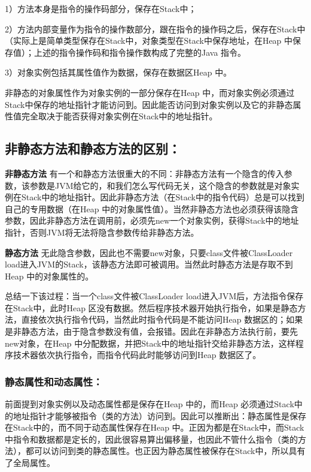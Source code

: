 \documentclass[10pt,b5paper]{article}
\begin{document}
1）方法本身是指令的操作码部分，保存在Stack中；

2）方法内部变量作为指令的操作数部分，跟在指令的操作码之后，保存在Stack中（实际上是简单类型保存在Stack中，对象类型在Stack中保存地址，在Heap 中保存值）；上述的指令操作码和指令操作数构成了完整的Java 指令。

3）对象实例包括其属性值作为数据，保存在数据区Heap 中。

非静态的对象属性作为对象实例的一部分保存在Heap 中，而对象实例必须通过Stack中保存的地址指针才能访问到。因此能否访问到对象实例以及它的非静态属性值完全取决于能否获得对象实例在Stack中的地址指针。
\subsection{非静态方法和静态方法的区别：}
\label{sec-4-2}

\textbf{非静态方法} 有一个和静态方法很重大的不同：非静态方法有一个隐含的传入参数，该参数是JVM给它的，和我们怎么写代码无关，这个隐含的参数就是对象实例在Stack中的地址指针。因此非静态方法（在Stack中的指令代码）总是可以找到自己的专用数据（在Heap 中的对象属性值）。当然非静态方法也必须获得该隐含参数，因此非静态方法在调用前，必须先new一个对象实例，获得Stack中的地址指针，否则JVM将无法将隐含参数传给非静态方法。

\textbf{静态方法} 无此隐含参数，因此也不需要new对象，只要class文件被ClassLoader load进入JVM的Stack，该静态方法即可被调用。当然此时静态方法是存取不到Heap 中的对象属性的。

总结一下该过程：当一个class文件被ClassLoader load进入JVM后，方法指令保存在Stack中，此时Heap 区没有数据。然后程序技术器开始执行指令，如果是静态方法，直接依次执行指令代码，当然此时指令代码是不能访问Heap 数据区的；如果是非静态方法，由于隐含参数没有值，会报错。因此在非静态方法执行前，要先new对象，在Heap 中分配数据，并把Stack中的地址指针交给非静态方法，这样程序技术器依次执行指令，而指令代码此时能够访问到Heap 数据区了。

\subsubsection{静态属性和动态属性：}
\label{sec-4-2-1}

前面提到对象实例以及动态属性都是保存在Heap 中的，而Heap 必须通过Stack中的地址指针才能够被指令（类的方法）访问到。因此可以推断出：静态属性是保存在Stack中的，而不同于动态属性保存在Heap 中。正因为都是在Stack中，而Stack中指令和数据都是定长的，因此很容易算出偏移量，也因此不管什么指令（类的方法），都可以访问到类的静态属性。也正因为静态属性被保存在Stack中，所以具有了全局属性。
\end{document}
